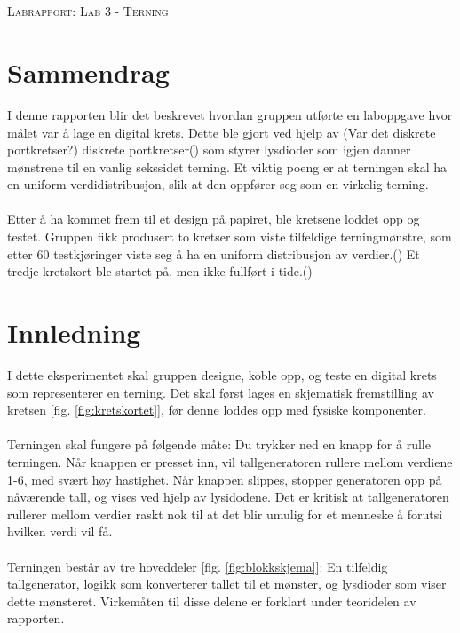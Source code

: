 \documentclass[12pt,norsk,a4paper]{article}
\begin{document}

\clearpage



\section*{} %
\thispagestyle{empty}   
\begin{center}
\Large \textsc{Labrapport: Lab 3 - Terning}
\end{center}
\clearpage

\section*{Sammendrag}
\thispagestyle{empty}  

I denne rapporten blir det beskrevet hvordan gruppen utførte en laboppgave hvor målet var å lage en digital krets. Dette ble gjort ved hjelp av (Var det diskrete portkretser?) diskrete portkretser() som styrer lysdioder som igjen danner mønstrene til en vanlig sekssidet terning. Et viktig poeng er at terningen skal ha en uniform verdidistribusjon, slik at den oppfører seg som en virkelig terning.\\
\\
Etter å ha kommet frem til et design på papiret, ble kretsene loddet opp og testet. Gruppen fikk produsert to kretser som viste tilfeldige terningmønstre, som etter 60 testkjøringer viste seg å ha en uniform distribusjon av verdier.() Et tredje kretskort ble startet på, men ikke fullført i tide.()
\clearpage

\tableofcontents %
\thispagestyle{empty}   
\clearpage

\section{Innledning} 
\setcounter{page}{1}
I dette eksperimentet skal gruppen designe, koble opp, og teste en digital krets som representerer en terning. Det skal først lages en skjematisk fremstilling av kretsen [fig. \ref{fig:kretskortet}], før denne loddes opp med fysiske komponenter. \\
\\
Terningen skal fungere på følgende måte: Du trykker ned en knapp for å rulle terningen. Når knappen er presset inn, vil tallgeneratoren rullere mellom verdiene 1-6, med svært høy hastighet. Når knappen slippes, stopper generatoren opp på nåværende tall, og vises ved hjelp av lysidodene. Det er kritisk at tallgeneratoren rullerer mellom verdier raskt nok til at det blir umulig for et menneske å forutsi hvilken verdi vil få.\\
\\
Terningen består av tre hoveddeler [fig. \ref{fig:blokkskjema}]: En tilfeldig tallgenerator, logikk som konverterer tallet til et mønster, og lysdioder som viser dette mønsteret. Virkemåten til disse delene er forklart under teoridelen av rapporten.
\end{document}
